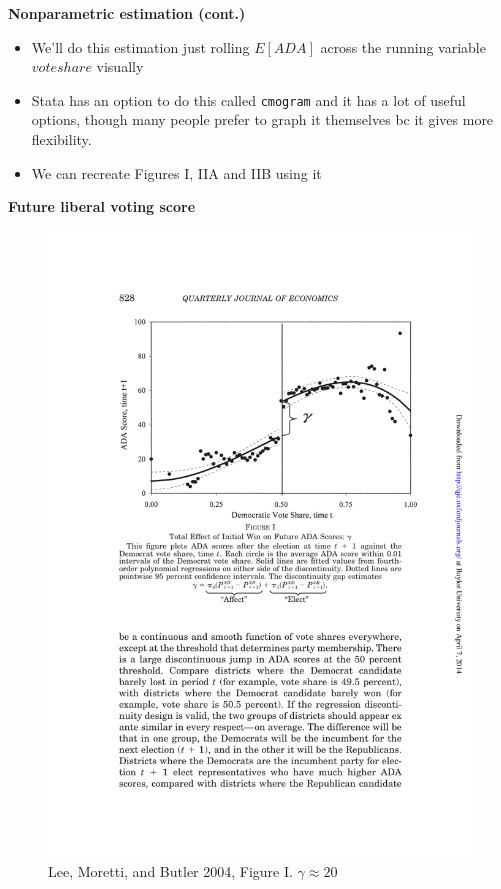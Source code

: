 \documentclass[notes=show]{beamer}
\begin{document}
\begin{frame}[plain]
\begin{center}
\textbf{Nonparametric estimation (cont.)}
\end{center}

\begin{itemize}
	\item We'll do this estimation just rolling $E[ ADA ]$ across the running variable $voteshare$ visually
	\item Stata has an option to do this called \texttt{cmogram} and it has a lot of useful options, though many people prefer to graph it themselves bc it gives more flexibility.  
	\item We can recreate Figures I, IIA and IIB using it
\end{itemize}
\end{frame}
	


\begin{frame}[plain]
	\begin{center}
	\textbf{Future liberal voting score}
	\end{center}
	
	\begin{figure}
	\includegraphics[scale=0.6]{./lecture_includes/lee_fig1.pdf}
	\caption{Lee, Moretti, and Butler 2004, Figure I. $\gamma\approx 20$}
	\end{figure}
\end{frame}
\end{document}
